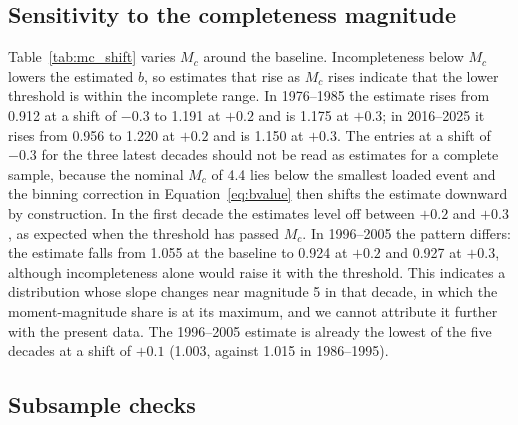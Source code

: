 \documentclass[11pt]{article}
\begin{document}
\subsection{Sensitivity to the completeness magnitude}

Table~\ref{tab:mc_shift} varies $M_c$ around the baseline. Incompleteness below $M_c$ lowers the estimated $b$, so estimates that rise as $M_c$ rises indicate that the lower threshold is within the incomplete range. In 1976--1985 the estimate rises from 0.912 at a shift of $-0.3$ to 1.191 at $+0.2$ and is 1.175 at $+0.3$; in 2016--2025 it rises from 0.956 to 1.220 at $+0.2$ and is 1.150 at $+0.3$.
The entries at a shift of $-0.3$ for the three latest decades should not be read as estimates for a complete sample, because the nominal $M_c$ of 4.4 lies below the smallest loaded event and the binning correction in Equation~\eqref{eq:bvalue} then shifts the estimate downward by construction. In the first decade the estimates level off between $+0.2$ and $+0.3$, as expected when the threshold has passed $M_c$. In 1996--2005 the pattern differs: the estimate falls from 1.055 at the baseline to 0.924 at $+0.2$ and 0.927 at $+0.3$, although incompleteness alone would raise it with the threshold.
This indicates a distribution whose slope changes near magnitude 5 in that decade, in which the moment-magnitude share is at its maximum, and we cannot attribute it further with the present data. The 1996--2005 estimate is already the lowest of the five decades at a shift of $+0.1$ (1.003, against 1.015 in 1986--1995).



\subsection{Subsample checks}
\end{document}

